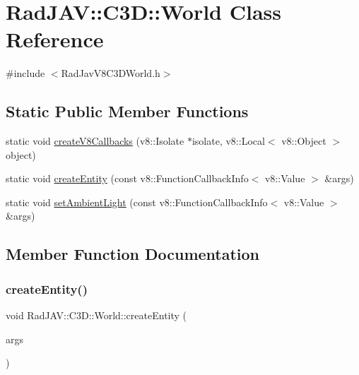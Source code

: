\hypertarget{class_rad_j_a_v_1_1_c3_d_1_1_world}{}\section{Rad\+J\+AV\+:\+:C3D\+:\+:World Class Reference}
\label{class_rad_j_a_v_1_1_c3_d_1_1_world}


{\ttfamily \#include $<$Rad\+Jav\+V8\+C3\+D\+World.\+h$>$}

\subsection*{Static Public Member Functions}
\begin{DoxyCompactItemize}
\item 
static void \mbox{\hyperlink{class_rad_j_a_v_1_1_c3_d_1_1_world_a4c68947e89d23a07544266cc70fceb36}{create\+V8\+Callbacks}} (v8\+::\+Isolate $\ast$isolate, v8\+::\+Local$<$ v8\+::\+Object $>$ object)
\item 
static void \mbox{\hyperlink{class_rad_j_a_v_1_1_c3_d_1_1_world_a5f7c4a5792a4cc478ea1e76382f42c67}{create\+Entity}} (const v8\+::\+Function\+Callback\+Info$<$ v8\+::\+Value $>$ \&args)
\item 
static void \mbox{\hyperlink{class_rad_j_a_v_1_1_c3_d_1_1_world_abb9f8b9d6390178578356fa1a214dbf8}{set\+Ambient\+Light}} (const v8\+::\+Function\+Callback\+Info$<$ v8\+::\+Value $>$ \&args)
\end{DoxyCompactItemize}


\subsection{Member Function Documentation}
\mbox{\label{class_rad_j_a_v_1_1_c3_d_1_1_world_a5f7c4a5792a4cc478ea1e76382f42c67}} 
\subsubsection{\texorpdfstring{create\+Entity()}{createEntity()}}
{\footnotesize\ttfamily void Rad\+J\+A\+V\+::\+C3\+D\+::\+World\+::create\+Entity (\begin{DoxyParamCaption}\item[{const v8\+::\+Function\+Callback\+Info$<$ v8\+::\+Value $>$ \&}]{args }\end{DoxyParamCaption})\hspace{0.3cm}{\ttfamily [static]}}

